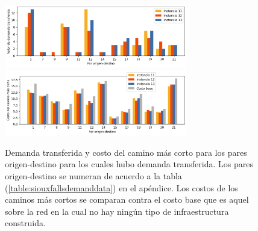\documentclass{article}
\begin{document}
  \begin{figure}[h!]
    \centering
    \includegraphics[width=8cm]{../resources/sensibility_case_study_demand.png}
    \includegraphics[width=8cm]{../resources/sensibility_case_study_shortest_paths.png}
    \caption{Demanda transferida y costo del camino más corto para los pares origen-destino para los cuales hubo demanda transferida. Los pares origen-destino se numeran de acuerdo a la tabla (\ref{table:siouxfallsdemanddata}) en el apéndice. Los costos de los caminos más cortos se comparan contra el costo base que es aquel sobre la red en la cual no hay ningún tipo de infraestructura construida.}
    \label{fig:sensibilitybyodpair_11_12_13}
  \end{figure}
\end{document}
